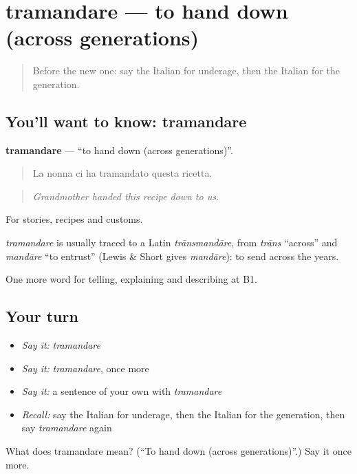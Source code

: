 \section[tramandare]{tramandare — to hand down (across generations)}

\label{lesson:IT-C309-tramandare}



\begin{quote}
Before the new one: say the Italian for underage, then the Italian for the generation.
\end{quote}

\subsection*{You'll want to know: tramandare}
\textbf{tramandare} — \textquotedblleft{}to hand down (across generations)\textquotedblright{}.

\begin{quote}
La nonna ci ha tramandato questa ricetta.
\end{quote}

\begin{quote}
\emph{Grandmother handed this recipe down to us.}
\end{quote}

For stories, recipes and customs.

\begin{cousinweb}
\emph{tramandare} is usually traced to a Latin \emph{trānsmandāre}, from \emph{trāns} \textquotedblleft{}across\textquotedblright{} and \emph{mandāre} \textquotedblleft{}to entrust\textquotedblright{} (Lewis \& Short gives \emph{mandāre}): to send across the years.
\end{cousinweb}

\begin{grammarlens}[title={What you've built}]
One more word for telling, explaining and describing at B1.
\end{grammarlens}

\subsection*{Your turn}
\begin{itemize}
\raggedright
  \item \emph{Say it:} \emph{tramandare}
  \item \emph{Say it:} \emph{tramandare}, once more
  \item \emph{Say it:} a sentence of your own with \emph{tramandare}
  \item \emph{Recall:} say the Italian for underage, then the Italian for the generation, then say \emph{tramandare} again
\end{itemize}

\begin{tcolorbox}[breakable,colback=teal!4,colframe=teal!35!black,title={Before you move on}]
What does tramandare mean? (\textquotedblleft{}To hand down (across generations)\textquotedblright{}.) Say it once more.
\end{tcolorbox}
